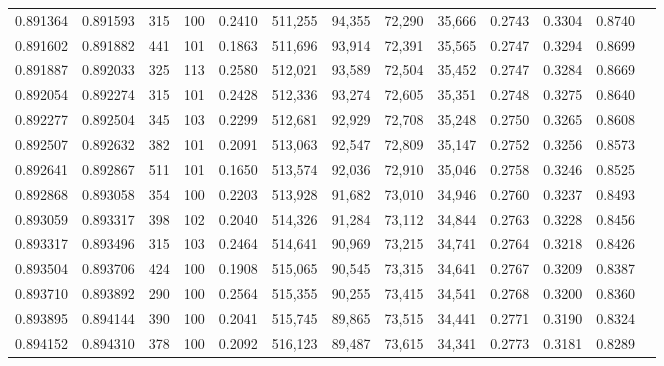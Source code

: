 \begin{tabular}{rrrrrrrrrrrrr}
0.891364 & 0.891593 &   315 & 100 &                                     0.2410 & 511,255 &  94,355 &  72,290 &  35,666 & 0.2743 & 0.3304 & 0.8740 \\
0.891602 & 0.891882 &   441 & 101 &                                     0.1863 & 511,696 &  93,914 &  72,391 &  35,565 & 0.2747 & 0.3294 & 0.8699 \\
0.891887 & 0.892033 &   325 & 113 &                                     0.2580 & 512,021 &  93,589 &  72,504 &  35,452 & 0.2747 & 0.3284 & 0.8669 \\
0.892054 & 0.892274 &   315 & 101 &                                     0.2428 & 512,336 &  93,274 &  72,605 &  35,351 & 0.2748 & 0.3275 & 0.8640 \\
0.892277 & 0.892504 &   345 & 103 &                                     0.2299 & 512,681 &  92,929 &  72,708 &  35,248 & 0.2750 & 0.3265 & 0.8608 \\
0.892507 & 0.892632 &   382 & 101 &                                     0.2091 & 513,063 &  92,547 &  72,809 &  35,147 & 0.2752 & 0.3256 & 0.8573 \\
0.892641 & 0.892867 &   511 & 101 &                                     0.1650 & 513,574 &  92,036 &  72,910 &  35,046 & 0.2758 & 0.3246 & 0.8525 \\
0.892868 & 0.893058 &   354 & 100 &                                     0.2203 & 513,928 &  91,682 &  73,010 &  34,946 & 0.2760 & 0.3237 & 0.8493 \\
0.893059 & 0.893317 &   398 & 102 &                                     0.2040 & 514,326 &  91,284 &  73,112 &  34,844 & 0.2763 & 0.3228 & 0.8456 \\
0.893317 & 0.893496 &   315 & 103 &                                     0.2464 & 514,641 &  90,969 &  73,215 &  34,741 & 0.2764 & 0.3218 & 0.8426 \\
0.893504 & 0.893706 &   424 & 100 &                                     0.1908 & 515,065 &  90,545 &  73,315 &  34,641 & 0.2767 & 0.3209 & 0.8387 \\
0.893710 & 0.893892 &   290 & 100 &                                     0.2564 & 515,355 &  90,255 &  73,415 &  34,541 & 0.2768 & 0.3200 & 0.8360 \\
0.893895 & 0.894144 &   390 & 100 &                                     0.2041 & 515,745 &  89,865 &  73,515 &  34,441 & 0.2771 & 0.3190 & 0.8324 \\
0.894152 & 0.894310 &   378 & 100 &                                     0.2092 & 516,123 &  89,487 &  73,615 &  34,341 & 0.2773 & 0.3181 & 0.8289 \\

\end{tabular}
